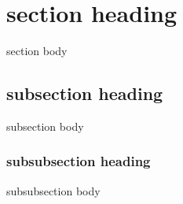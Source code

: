 \documentclass{article}
\begin{document}
\section{section heading}
 section body

\subsection{subsection heading}
	subsection body

	\subsubsection{subsubsection heading}
	subsubsection body
\end{document}
